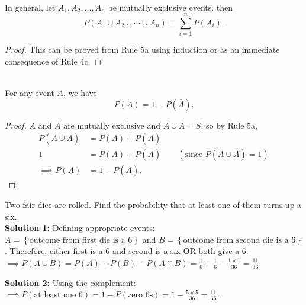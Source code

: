\begin{theorem}
    \phantom{}  \\
    In general, let $A_1, A_2, \ldots, A_n$ be mutually exclusive events. then
    \[P(A_1 \cup A_2 \cup \cdots \cup A_n) = \sum_{i=1}^{n}P(A_i).\]
\end{theorem}

\begin{proof}
    This can be proved from Rule 5a using induction or as an immediate consequence of Rule 4c.
\end{proof}

\begin{theorem}
    \phantom{}  \\
    For any event $A$, we have \[P(A) = 1 - P(\overline{A}).\]
\end{theorem}

\begin{proof}
    $A$ and $\overline{A}$ are mutually exclusive and $A \cup \overline{A} = S$, so by Rule 5a,
    \begin{align*}
        P(A \cup \overline{A}) &= P(A) + P(\overline{A})    \\
                             1 &= P(A) + P(\overline{A})    \qquad \left( \text{since $P(A \cup \overline{A}) = 1$} \right)    \\
                 \implies P(A) &= 1 - P(\overline{A}).
    \end{align*}
\end{proof}

\begin{example}
    Two fair dice are rolled. Find the probability that at least one of them turns up a six. \\
    \textbf{Solution 1: } Defining appropriate events: \\
    $A = \left\{  \text{outcome from first die is a 6} \right\}$ and $B = \left\{  \text{outcome from second die is a 6} \right\}$.
    Therefore, either first is a 6 and second is a six OR both give a 6. \\
    $\implies P(A \cup B) = P(A) + P(B) - P(A \cap B) = \frac{1}{6} + \frac{1}{6} - \frac{1 \times 1}{36} = \frac{11}{36}$.

    \textbf{Solution 2:} Using the complement: \\
    $\implies P(\text{at least one 6}) = 1 - P(\text{zero 6s}) = 1 - \frac{5 \times 5}{36} = \frac{11}{36}$.
\end{example}


